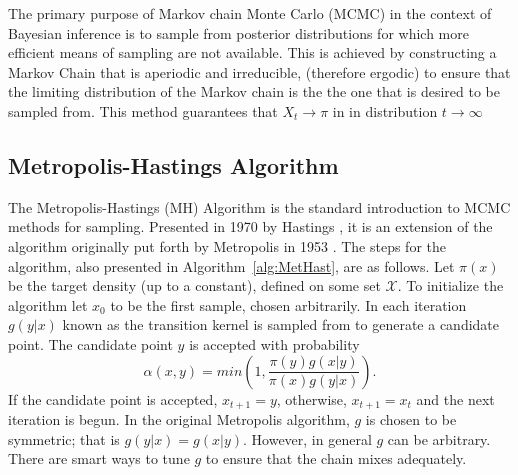 
	The primary purpose of Markov chain Monte Carlo (MCMC) in the context of Bayesian inference is to sample from posterior distributions for which more efficient means of sampling are not available.
	{\color{red}This is achieved by constructing a Markov Chain that is aperiodic and irreducible, (therefore ergodic) to ensure that the limiting distribution of the Markov chain is the the one that is desired to be sampled from. This method guarantees that $X_t\rightarrow\pi$ in in distribution $t\rightarrow\infty$}
	\subsection{Metropolis-Hastings Algorithm}
	The Metropolis-Hastings (MH) Algorithm is the standard introduction to MCMC methods for sampling. Presented in 1970 by Hastings \cite{hastings1970monte}, it is an extension of the algorithm originally put forth by Metropolis in 1953 \cite{metropolis1953equation}.
	The steps for the algorithm, also presented in Algorithm~\ref{alg:MetHast}, are as follows. Let $\pi(x)$ be the target density (up to a constant), defined on some set ${\mathscr X}$.
	To initialize the algorithm let $x_0$ to be the first sample, chosen arbitrarily. In each iteration $g(y|x)$ 
    known as the {\color{red}transition kernel} is sampled from to generate a candidate point. The candidate point $y$ is accepted with probability 
	    \begin{equation}
	        \alpha(x,y) = min\left(1,\frac{\pi(y)g(x|y)}{\pi(x)g(y|x)}\right).
	    \end{equation}
	If the candidate point is accepted, $x_{t+1} = y$, otherwise, $x_{t+1} = x_t$ and the next iteration is begun. In the original Metropolis algorithm, $g$ is chosen to be symmetric; that is $g(y|x) = g(x|y)$. However, in general $g$ can be arbitrary. There are smart ways to tune $g$ to ensure that the chain mixes adequately.
	
